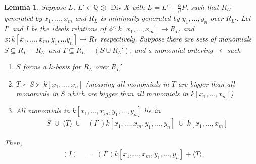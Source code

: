 \documentclass{amsart}
\theoremstyle{plain}
\newtheorem{lem}[thm]{Lemma}
\theoremstyle{definition}
\theoremstyle{remark}
\numberwithin{equation}{section}
\newcommand\BQ{{\mathbb Q}}
\DeclareMathOperator\di{Div}
\newcommand{\halfcan}{L}
\DeclareMathOperator{\initial}{in_\prec}
\begin{document}
\begin{lem}
\label{lem:relations_from_generators_induction} 
Suppose $\halfcan$, $\halfcan' \in \BQ$ $\otimes$ $\di X$ with $\halfcan=\halfcan'+\frac{\alpha}{\beta}P$, such that $R_{\halfcan'}$ generated by $x_1, \ldots, x_m$
and $R_{\halfcan}$ is minimally generated by $y_1, \ldots, y_n$ over 
$R_{\halfcan'}$.  Let $I'$ and $I$ be the ideals relations of $\phi':k[x_1, \ldots, x_m]\to R_{\halfcan'}$ and $\phi:k[x_1, \ldots, x_m, y_1, \ldots y_n]\to R_{\halfcan}$ respectively.
Suppose there are sets of monomials $S\subseteq R_\halfcan-R_{\halfcan'}$ and $T\subseteq R_\halfcan-(S\cup R_\halfcan')$, and a monomial ordering $\prec$ such 
\begin{enumerate}
\item $S$ forms a $k$-basis for $R_\halfcan$ over $R_\halfcan'$
\item $T \succ S\succ k[x_1, \ldots, x_n]$ {\rm(}meaning all monomials in $T$ are bigger than all monomials in $S$ which are bigger than all monomials in $k[x_1, \ldots, x_n]${\rm)}
\item All monomials in $k[x_1, \ldots, x_m, y_1, \ldots, y_n]$ lie in 
\begin{align*}
	S \; \cup\; \langle T\rangle \; \cup \; \initial(I') k[x_1, \ldots, x_m, y_1, \ldots, y_n] \; \cup \; k[x_1, \ldots, x_m]
\end{align*}
\end{enumerate}
Then,
\begin{align*}
	\initial(I) & = \initial(I') k[x_1, \ldots, x_m, y_1, \ldots, y_n]
	+ \langle T \rangle.
\end{align*}
\end{lem}
\end{document}
